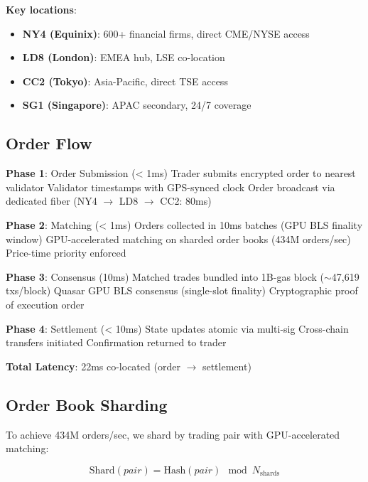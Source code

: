 \documentclass[11pt,letterpaper]{article}
\begin{document}
\textbf{Key locations}:
\begin{itemize}
    \item \textbf{NY4 (Equinix)}: 600+ financial firms, direct CME/NYSE access
    \item \textbf{LD8 (London)}: EMEA hub, LSE co-location
    \item \textbf{CC2 (Tokyo)}: Asia-Pacific, direct TSE access
    \item \textbf{SG1 (Singapore)}: APAC secondary, 24/7 coverage
\end{itemize}

\subsection{Order Flow}

\begin{algorithm}
\caption{Lightspeed Order Execution}
\begin{algorithmic}
\STATE \textbf{Phase 1}: Order Submission (< 1ms)
\STATE Trader submits encrypted order to nearest validator
\STATE Validator timestamps with GPS-synced clock
\STATE Order broadcast via dedicated fiber (NY4 $\to$ LD8 $\to$ CC2: 80ms)

\STATE \textbf{Phase 2}: Matching (< 1ms)
\STATE Orders collected in 10ms batches (GPU BLS finality window)
\STATE GPU-accelerated matching on sharded order books (434M orders/sec)
\STATE Price-time priority enforced

\STATE \textbf{Phase 3}: Consensus (10ms)
\STATE Matched trades bundled into 1B-gas block ($\sim$47,619 txs/block)
\STATE Quasar GPU BLS consensus (single-slot finality)
\STATE Cryptographic proof of execution order

\STATE \textbf{Phase 4}: Settlement (< 10ms)
\STATE State updates atomic via multi-sig
\STATE Cross-chain transfers initiated
\STATE Confirmation returned to trader

\STATE \textbf{Total Latency}: 22ms co-located (order $\to$ settlement)
\end{algorithmic}
\end{algorithm}

\subsection{Order Book Sharding}

To achieve 434M orders/sec, we shard by trading pair with GPU-accelerated matching:

\begin{equation}
\text{Shard}(pair) = \text{Hash}(pair) \mod N_{\text{shards}}
\end{equation}
\end{document}
